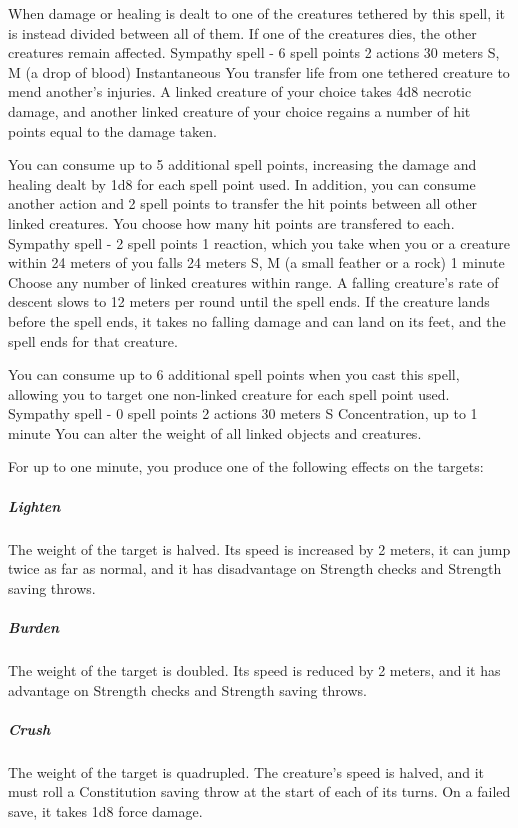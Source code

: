         When damage or healing is dealt to one of the creatures tethered by this spell, it is instead divided between all of them.
        If one of the creatures dies, the other creatures remain affected.
        {Sympathy spell - 6 spell points}
        {2 actions}
        {30 meters}
        {S, M (a drop of blood)}
        {Instantaneous}
        You transfer life from one tethered creature to mend another's injuries.
        A linked creature of your choice takes 4d8 necrotic damage, and another linked creature of your choice regains a number of hit points equal to the damage taken.

        You can consume up to 5 additional spell points, increasing the damage and healing dealt by 1d8 for each spell point used.
        In addition, you can consume another action and 2 spell points to transfer the hit points between all other linked creatures.
        You choose how many hit points are transfered to each.
        {Sympathy spell - 2 spell points}
        {1 reaction, which you take when you or a creature within 24 meters of you falls}
        {24 meters}
        {S, M (a small feather or a rock)}
        {1 minute}
        Choose any number of linked creatures within range.
        A falling creature's rate of descent slows to 12 meters per round until the spell ends.
        If the creature lands before the spell ends, it takes no falling damage and can land on its feet, and the spell ends for that creature.

        You can consume up to 6 additional spell points when you cast this spell, allowing you to target one non-linked creature for each spell point used.
        {Sympathy spell - 0 spell points}
        {2 actions}
        {30 meters}
        {S}
        {Concentration, up to 1 minute}
        You can alter the weight of all linked objects and creatures.

        For up to one minute, you produce one of the following effects on the targets:
        \subparagraph{Lighten}
        The weight of the target is halved.
        Its speed is increased by 2 meters, it can jump twice as far as normal, and it has disadvantage on Strength checks and Strength saving throws.
        \subparagraph{Burden}
        The weight of the target is doubled.
        Its speed is reduced by 2 meters, and it has advantage on Strength checks and Strength saving throws.
        \subparagraph{Crush}
        The weight of the target is quadrupled.
        The creature's speed is halved, and it must roll a Constitution saving throw at the start of each of its turns.
        On a failed save, it takes 1d8 force damage.
